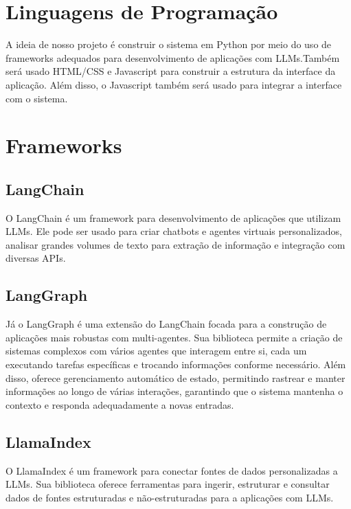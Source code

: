 \documentclass[
	12pt,				%
	openright,			%
	oneside,			    %
	a4paper,				%
	english,			%
	french,			%
	spanish,			%
	brazil			%
	]{abntex2}
\begin{document}
\section{Linguagens de Programação}
A ideia de nosso projeto é construir o sistema em Python por meio do uso de frameworks adequados para desenvolvimento de aplicações com LLMs.Também será usado HTML/CSS e Javascript para construir a estrutura da interface da aplicação. Além disso, o Javascript também será usado para integrar a interface com o sistema.


\section{Frameworks}
    \subsection{LangChain}
    O LangChain é um framework para desenvolvimento de aplicações que utilizam LLMs. Ele pode ser usado para criar chatbots e agentes virtuais personalizados, analisar grandes volumes de texto para extração de informação e integração com diversas APIs.\cite{langchain}
    

    \subsection{LangGraph}
    Já o LangGraph é uma extensão do LangChain focada para a construção de aplicações mais robustas com multi-agentes. Sua biblioteca permite a criação de sistemas complexos com vários agentes que interagem entre si, cada um executando tarefas específicas e trocando informações conforme necessário. Além disso, oferece gerenciamento automático de estado, permitindo rastrear e manter informações ao longo de várias interações, garantindo que o sistema mantenha o contexto e responda adequadamente a novas entradas.\cite{langgraph}

    \subsection{LlamaIndex}
    O LlamaIndex é um framework para conectar fontes de dados personalizadas a LLMs. Sua biblioteca oferece ferramentas para ingerir, estruturar e consultar dados de fontes estruturadas e não-estruturadas para a aplicações com LLMs.\cite{llamaindex}
    
\postextual



\end{document}
